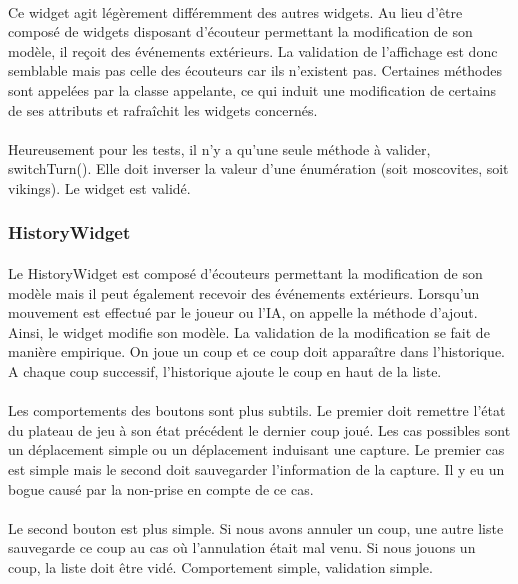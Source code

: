 \documentclass[11pt]{article} %
\begin{document}
\begin{sffamily}
\paragraph{}
Ce widget agit légèrement différemment des autres widgets. Au lieu d'être composé de widgets disposant d’écouteur permettant la modification de son modèle, il reçoit des événements extérieurs. La validation de l'affichage est donc semblable mais pas celle des écouteurs car ils n'existent pas. Certaines méthodes sont appelées par la classe appelante, ce qui induit une modification de certains de ses attributs et rafraîchit les widgets concernés.
\paragraph{}
Heureusement pour les tests, il n'y a qu'une seule méthode à valider, switchTurn(). Elle doit inverser la valeur d'une énumération (soit moscovites, soit vikings). Le widget est validé.

\subsubsection{HistoryWidget}

\paragraph{}
Le HistoryWidget est composé d'écouteurs permettant la modification de son modèle mais il peut également recevoir des événements extérieurs. Lorsqu'un mouvement est effectué par le joueur ou l'IA, on appelle la méthode d'ajout. Ainsi, le widget modifie son modèle. La validation de la modification se fait de manière empirique. On joue un coup et ce coup doit apparaître dans l'historique. A chaque coup successif, l'historique ajoute le coup en haut de la liste. 
\paragraph{}
Les comportements des boutons sont plus subtils. Le premier doit remettre l'état du plateau de jeu à son état précédent le dernier coup joué. Les cas possibles sont un déplacement simple ou un déplacement induisant une capture. Le premier cas est simple mais le second doit sauvegarder l'information de la capture. Il y eu un bogue causé par la non-prise en compte de ce cas.
\paragraph{}
Le second bouton est plus simple. Si nous avons annuler un coup, une autre liste sauvegarde ce coup au cas où l'annulation était mal venu. Si nous jouons un coup, la liste doit être vidé. Comportement simple, validation simple.

\end{sffamily}
\end{document}
